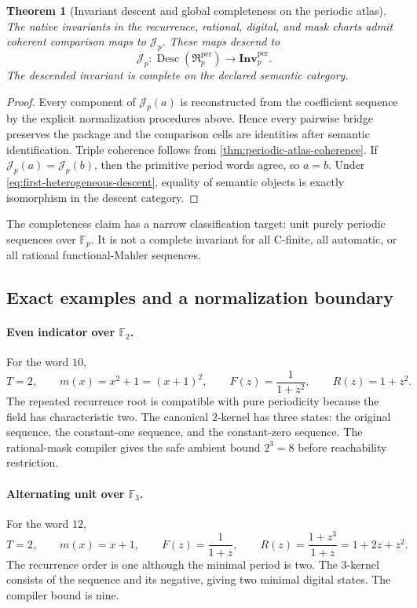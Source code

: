 \documentclass[11pt]{article}
\newtheorem{theorem}{Theorem}[section]
\theoremstyle{definition}
\theoremstyle{remark}
\DeclareMathOperator{\Desc}{Desc}
\begin{document}
\begin{theorem}[Invariant descent and global completeness on the periodic atlas]
\label{thm:periodic-invariant-completeness}
The native invariants in the recurrence, rational, digital, and mask charts admit coherent comparison maps to \(\mathcal J_p\).  These maps descend to
\[
\mathcal J_p:
\Desc(\mathfrak R_p^{\mathrm{per}})
\longrightarrow
\mathbf{Inv}_p^{\mathrm{per}}.
\]
The descended invariant is complete on the declared semantic category.
\end{theorem}

\begin{proof}
Every component of \(\mathcal J_p(a)\) is reconstructed from the coefficient sequence by the explicit normalization procedures above.  Hence every pairwise bridge preserves the package and the comparison cells are identities after semantic identification.  Triple coherence follows from \cref{thm:periodic-atlas-coherence}.  If \(\mathcal J_p(a)=\mathcal J_p(b)\), then the primitive period words agree, so \(a=b\).  Under \cref{eq:first-heterogeneous-descent}, equality of semantic objects is exactly isomorphism in the descent category.
\end{proof}

The completeness claim has a narrow classification target: unit purely periodic sequences over \(\mathbb F_p\).  It is not a complete invariant for all C-finite, all automatic, or all rational functional-Mahler sequences.

\subsection{Exact examples and a normalization boundary}



\paragraph{Even indicator over \(\mathbb F_2\).}
For the word \(10\),
\[
T=2,
\qquad
m(x)=x^2+1=(x+1)^2,
\qquad
F(z)=\frac{1}{1+z^2},
\qquad
R(z)=1+z^2.
\]
The repeated recurrence root is compatible with pure periodicity because the field has characteristic two.  The canonical \(2\)-kernel has three states: the original sequence, the constant-one sequence, and the constant-zero sequence.  The rational-mask compiler gives the safe ambient bound \(2^3=8\) before reachability restriction.

\paragraph{Alternating unit over \(\mathbb F_3\).}
For the word \(12\),
\[
T=2,
\qquad
m(x)=x+1,
\qquad
F(z)=\frac{1}{1+z},
\qquad
R(z)=\frac{1+z^3}{1+z}=1+2z+z^2.
\]
The recurrence order is one although the minimal period is two.  The \(3\)-kernel consists of the sequence and its negative, giving two minimal digital states.  The compiler bound is nine.
\end{document}
